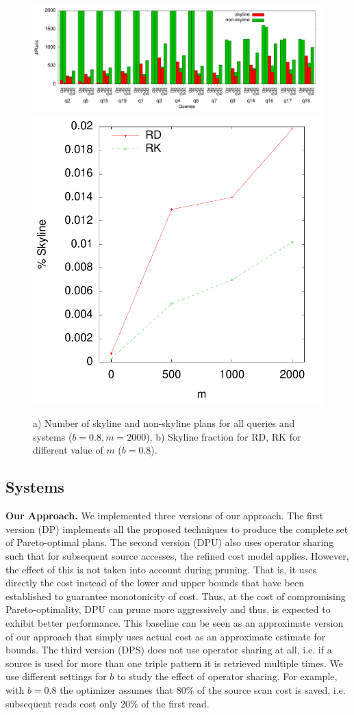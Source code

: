 \begin{figure}[htb]
  \centering
  \includegraphics[width=0.75\linewidth]{figs/all_queries.pdf}
  \includegraphics[width=0.24\linewidth]{figs/plans_skyline_by_m.pdf}
  \caption{a) Number of skyline and non-skyline plans for all queries
    and systems ($b=0.8, m=2000$), b) Skyline fraction for RD, RK for
    different value of $m$ ($b=0.8$).}
  \label{fig:queries}
\end{figure}

\subsection{Systems}
\textbf{Our Approach.} We implemented three versions of our
approach. The first version (DP) implements all the proposed
techniques to produce the complete set of Pareto-optimal plans. The
second version (DPU) also uses operator sharing such that for
subsequent source accesses, the refined cost model applies. However,
the effect of this is not taken into account during pruning.  That is,
it uses directly the cost instead of the lower and upper bounds that
have been established to guarantee monotonicity of cost. Thus, at the
cost of compromising Pareto-optimality, DPU can prune more
aggressively and thus, is expected to exhibit better performance. This baseline can be seen as an approximate version of our approach that simply uses actual cost as an approximate estimate for bounds. 
The third version (DPS) does not use
operator sharing at all, i.e. if a source is used for more than one
triple pattern it is retrieved multiple times. 
We use different settings for $b$ to study the effect of operator sharing. For example, with $b=0.8$ the optimizer assumes that 80\% of
the source scan cost is saved, i.e. subsequent reads cost only 20\% of the first read.

